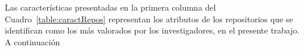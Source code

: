 \documentclass[runningheads]{llncs}
\begin{document}
Las características presentadas en la primera columna del Cuadro~\ref{table:caractRepos} representan los atributos de los repositorios que se identifican como los más valorados por los investigadores, en el presente trabajo. A continuación 

\end{document}
